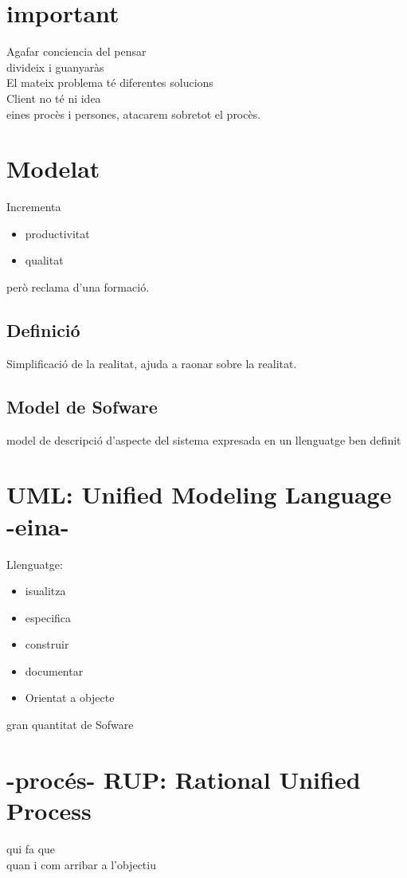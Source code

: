 \documentclass{article}
\begin{document}
\section{important}
Agafar conciencia del pensar\\ divideix i guanyaràs\\
El mateix problema té diferentes solucions\\
Client no té ni idea\\ eines procès i persones, atacarem sobretot el procès.\\

\section{Modelat}
Incrementa
\begin{itemize}
	\item productivitat
	\item qualitat
\end{itemize}
però reclama d'una formació.\\
\subsection{Definició}
Simplificació de la realitat, ajuda a raonar sobre la realitat.
\subsection{Model de Sofware}
model de descripció d'aspecte del sistema expresada en un llenguatge ben definit

\section{UML: Unified Modeling Language -eina-}
Llenguatge:
\begin{itemize}
	\item isualitza
	\item especifica
	\item construir
	\item documentar
	\item Orientat a objecte
\end{itemize}
gran quantitat de Sofware

\section{-procés- RUP: Rational Unified Process}
qui fa que\\
quan i com arribar a l'objectiu\\
\end{document}
